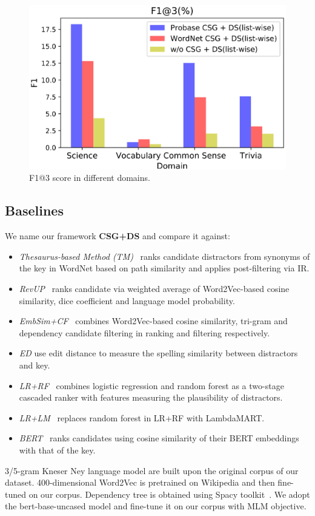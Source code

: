 \begin{figure}[ht]
	\centering
	\includegraphics[width=1.0\columnwidth]{figure/f1.eps}
	\caption{F1@3 score in different domains.}
	\label{fig:domains}
\end{figure}

\subsection{Baselines}
We name our framework \textbf{CSG+DS} and compare it against:
\begin{itemize}
	\item \textit{Thesaurus-based Method (TM)}~\cite{sumita2005measuring} ranks candidate distractors from synonyms of the key in WordNet based on path similarity and applies post-filtering via IR.
\item \textit{RevUP}~\cite{Kumar2015RevUP} ranks candidate  via  weighted average of Word2Vec-based cosine similarity, dice coefficient and language model probability.
\item \textit{EmbSim+CF}~\cite{jiang2017distractor} combines Word2Vec-based cosine similarity, tri-gram and dependency candidate filtering in ranking and filtering respectively.
\item \textit{ED} use edit distance to measure the spelling similarity between distractors and key.

\item \textit{LR+RF}~\cite{liang2018distractor} combines logistic regression and random forest as a two-stage cascaded ranker with features measuring the plausibility of distractors.
\item \textit{LR+LM}~\cite{liang2018distractor} replaces random forest in LR+RF with LambdaMART.

\item \textit{BERT}~\cite{devlin-etal-2019-bert} ranks candidates using cosine similarity of their BERT embeddings with that of the key.
\end{itemize}
3/5-gram Kneser Ney language model are built upon the original corpus of our dataset. 400-dimensional Word2Vec is pretrained on Wikipedia  and then fine-tuned on our corpus. Dependency tree is obtained using Spacy toolkit~\cite{spacy2}. We adopt the bert-base-uncased model and fine-tune it on our corpus with MLM objective.


